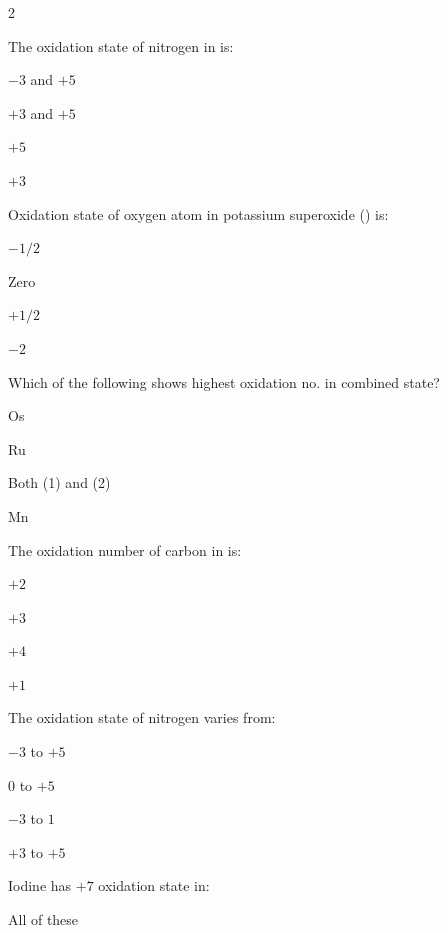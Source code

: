 \documentclass[10pt,a4paper]{article}
\begin{document}
\begin{multicols}{2}
\begin{questions}[start=56]
\item The oxidation state of nitrogen in  is:
\begin{options}
  \item $-3$ and $+5$
  \item $+3$ and $+5$
  \item $+5$
  \item $+3$
\end{options}

\item Oxidation state of oxygen atom in potassium superoxide () is:
\begin{options}
  \item $-1/2$
  \item Zero
  \item $+1/2$
  \item $-2$
\end{options}

\item Which of the following shows highest oxidation no. in combined state?
\begin{options}
  \item Os
  \item Ru
  \item Both (1) and (2)
  \item Mn
\end{options}

\item The oxidation number of carbon in  is:
\begin{options}
  \item $+2$
  \item $+3$
  \item $+4$
  \item $+1$
\end{options}

\item The oxidation state of nitrogen varies from:
\begin{options}
  \item $-3$ to $+5$
  \item $0$ to $+5$
  \item $-3$ to $1$
  \item $+3$ to $+5$
\end{options}

\item Iodine has $+7$ oxidation state in:
\begin{options}
  \item {}
  \item {}
  \item {}
  \item All of these
\end{options}


\end{questions}
\end{multicols}
\end{document}
